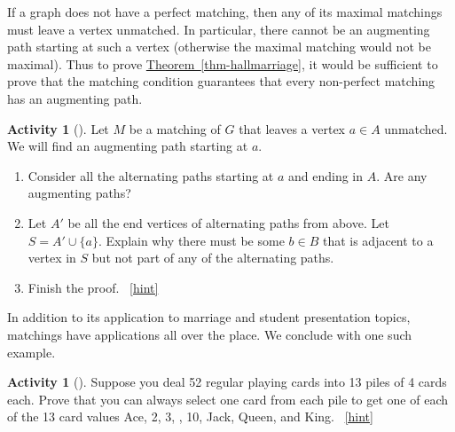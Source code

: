\documentclass[10pt,]{book}
\theoremstyle{plain}
\theoremstyle{definition}
\theoremstyle{definition}
\theoremstyle{definition}
\newtheorem{activity}[project]{Activity}
\numberwithin{equation}{chapter}
\begin{document}
\hypertarget{p-454}{}%
If a graph does not have a perfect matching, then any of its maximal matchings must leave a vertex unmatched.  In particular, there cannot be an augmenting path starting at such a vertex (otherwise the maximal matching would not be maximal).  Thus to prove \hyperref[thm-hallmarriage]{Theorem~\ref{thm-hallmarriage}}, it would be sufficient to prove that the matching condition guarantees that every non-perfect matching has an augmenting path.%
\begin{activity}[]\label{activity-53}
\hypertarget{p-455}{}%
Let \(M\) be a matching of \(G\) that leaves a vertex \(a \in A\) unmatched.  We will find an augmenting path starting at \(a\).%
\begin{enumerate}[font=\bfseries,label=(\alph*),ref=\alph*]
\item\label{task-65} \hypertarget{p-456}{}%
Consider all the alternating paths starting at \(a\) and ending in \(A\).  Are any augmenting paths?%
\item\label{task-66} \hypertarget{p-457}{}%
Let \(A'\) be all the end vertices of alternating paths from above.  Let \(S = A' \cup \{a\}\).  Explain why there must be some \(b \in B\) that is adjacent to a vertex in \(S\) but not part of any of the alternating paths.%
\item\label{task-67} \hypertarget{p-458}{}%
Finish the proof.%
~\hfill{\tiny\hyperlink{a-60.c}{[hint]}\hypertarget{q-60.c}{}}\end{enumerate}
\end{activity}
\hypertarget{p-460}{}%
In addition to its application to marriage and student presentation topics, matchings have applications all over the place. We conclude with one such example.%
\begin{activity}[]\label{activity-54}
\hypertarget{p-461}{}%
Suppose you deal 52 regular playing cards into 13 piles of 4 cards each. Prove that you can always select one card from each pile to get one of each of the 13 card values Ace, 2, 3, \textellipsis{}, 10, Jack, Queen, and King.%
~\hfill{\tiny\hyperlink{a-61}{[hint]}\hypertarget{q-61}{}}\end{activity}
\end{document}
